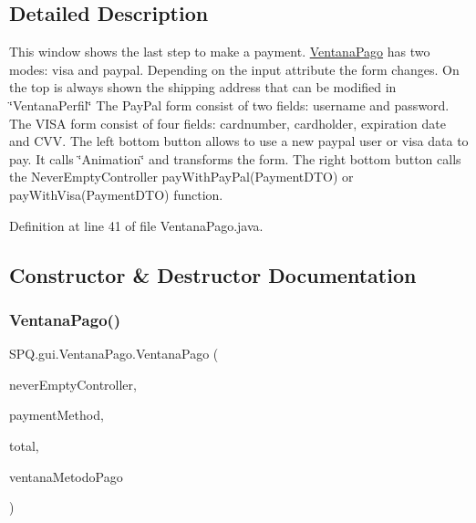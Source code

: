\subsection{Detailed Description}
This window shows the last step to make a payment. \mbox{\hyperlink{class_s_p_q_1_1gui_1_1_ventana_pago}{Ventana\+Pago}} has two modes\+: visa and paypal. Depending on the input attribute the form changes. On the top is always shown the shipping address that can be modified in \char`\"{}\+Ventana\+Perfil\char`\"{} The Pay\+Pal form consist of two fields\+: username and password. The V\+I\+SA form consist of four fields\+: cardnumber, cardholder, expiration date and C\+VV. The left bottom button allows to use a new paypal user or visa data to pay. It calls \char`\"{}\+Animation\char`\"{} and transforms the form. The right bottom button calls the Never\+Empty\+Controller pay\+With\+Pay\+Pal(\+Payment\+D\+T\+O) or pay\+With\+Visa(\+Payment\+D\+T\+O) function. 

Definition at line 41 of file Ventana\+Pago.\+java.



\subsection{Constructor \& Destructor Documentation}
\mbox{\label{class_s_p_q_1_1gui_1_1_ventana_pago_ac192c8e330c672202608380ffaabd275}} 
\subsubsection{\texorpdfstring{Ventana\+Pago()}{VentanaPago()}}
{\footnotesize\ttfamily S\+P\+Q.\+gui.\+Ventana\+Pago.\+Ventana\+Pago (\begin{DoxyParamCaption}\item[{\mbox{\hyperlink{class_s_p_q_1_1controller_1_1_never_empty_controller}{Never\+Empty\+Controller}}}]{never\+Empty\+Controller,  }\item[{String}]{payment\+Method,  }\item[{double}]{total,  }\item[{\mbox{\hyperlink{class_s_p_q_1_1gui_1_1_ventana_metodo_pago}{Ventana\+Metodo\+Pago}}}]{ventana\+Metodo\+Pago }\end{DoxyParamCaption})}



